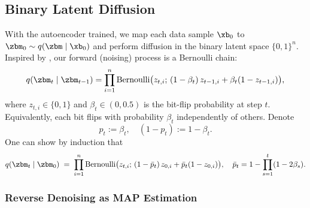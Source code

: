 \documentclass[11pt,letterpaper]{article}
\begin{document}
\subsection{Binary Latent Diffusion}
\label{subsec:binary-diffusion}

With the autoencoder trained, we map each data sample $\xb_0$ to $\zbm_0 \sim q(\zbm \mid \xb_0)$ and perform diffusion in the binary latent space $\{0,1\}^n$. Inspired by \cite{wang2023binary}, our forward (noising) process is a Bernoulli chain:
\begin{equation}
q(\zbm_t \mid \zbm_{t-1}) = \prod_{i=1}^n \mathrm{Bernoulli}\bigl(z_{t,i};\, (1-\beta_t)\,z_{t-1,i} + \beta_t (1 - z_{t-1,i})\bigr),
\label{eq:bernoulli-forward}
\end{equation}
where $z_{t,i} \in \{0,1\}$ and $\beta_t \in (0,0.5)$ is the bit-flip probability at step $t$. Equivalently, each bit flips with probability $\beta_t$ independently of others. Denote
\[
p_t := \beta_t,\quad (1-p_t) := 1-\beta_t.
\]
One can show by induction that
\begin{equation}
q(\zbm_t \mid \zbm_0) 
\;=\; \prod_{i=1}^n \mathrm{Bernoulli}\bigl(z_{t,i};\, (1-\bar p_t)\,z_{0,i} + \bar p_t(1 - z_{0,i})\bigr), \quad
\bar p_t = 1 - \prod_{s=1}^t (1-2\beta_s).
\end{equation}

\subsubsection{Reverse Denoising as MAP Estimation}
\end{document}
